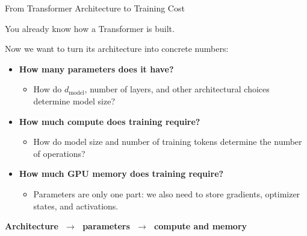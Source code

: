 \documentclass[11pt,compress,t,notes=noshow, xcolor=table]{beamer}
\begin{document}




\begin{vbframe}{From Transformer Architecture to Training Cost}

\vfill

You already know how a Transformer is built.

Now we want to turn its architecture into concrete numbers:

\begin{itemize}
    \item \textbf{How many parameters does it have?}
    \begin{itemize}
        \item How do $d_{\text{model}}$, number of layers, and other
        architectural choices determine model size?
    \end{itemize}

    \item \textbf{How much compute does training require?}
    \begin{itemize}
        \item How do model size and number of training tokens determine
        the number of operations?
    \end{itemize}

    \item \textbf{How much GPU memory does training require?}
    \begin{itemize}
        \item Parameters are only one part: we also need to store
        gradients, optimizer states, and activations.
    \end{itemize}
\end{itemize}

\centering
\textbf{Architecture $\;\longrightarrow\;$ parameters
$\;\longrightarrow\;$ compute and memory}

\vfill

\end{vbframe}

\end{document}
